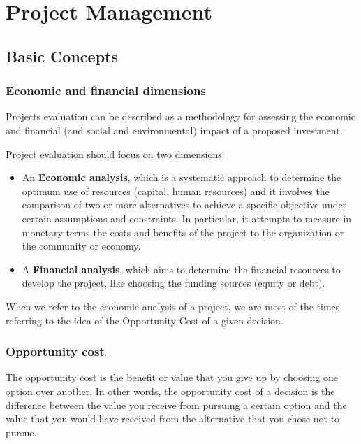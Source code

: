\documentclass[]{book}
\theoremstyle{definition}
\theoremstyle{definition}
\theoremstyle{definition}
\theoremstyle{remark}
\begin{document}
\chapter{Project Management}\label{project-management}

\section{Basic Concepts}\label{basic-concepts}

\subsection{Economic and financial
dimensions}\label{economic-and-financial-dimensions}

Projects evaluation can be described as a methodology for assessing the
economic and financial (and social and environmental) impact of a
proposed investment.

Project evaluation should focus on two dimensions:

\begin{itemize}
\item
  An \textbf{Economic analysis}, which is a systematic approach to
  determine the optimum use of resources (capital, human resources) and
  it involves the comparison of two or more alternatives to achieve a
  specific objective under certain assumptions and constraints. In
  particular, it attempts to measure in monetary terms the costs and
  benefits of the project to the organization or the community or
  economy.
\item
  A \textbf{Financial analysis}, which aims to determine the financial
  resources to develop the project, like choosing the funding sources
  (equity or debt).
\end{itemize}

When we refer to the economic analysis of a project, we are most of the
times referring to the idea of the Opportunity Cost of a given decision.

\subsection{Opportunity cost}\label{opportunity-cost}

The opportunity cost is the benefit or value that you give up by
choosing one option over another. In other words, the opportunity cost
of a decision is the difference between the value you receive from
pursuing a certain option and the value that you would have received
from the alternative that you chose not to pursue.
\end{document}
